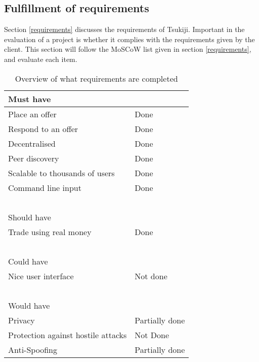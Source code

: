 \subsection{Fulfillment of requirements}
\label{requirementsfill}
Section \ref{requirements} discusses the requirements of Tsukiji.
Important in the evaluation of a project is whether it complies with the requirements given by the client.
This section will follow the MoSCoW list given in section \ref{requirements}, and evaluate each item.
\begin{table}[H]
\centering
    \begin{tabular}{|l|l|}
    \hline
    Must have                          & ~              \\ \hline
    Place an offer                     & Done           \\
    Respond to an offer                & Done           \\
    Decentralised                      & Done           \\
    Peer discovery                     & Done           \\
    Scalable to thousands of users     & Done           \\
    Command line input                 & Done           \\
    ~                                  & ~              \\ \hline
    Should have                        & ~              \\ \hline
    Trade using real money             & Done           \\
    ~                                  & ~              \\ \hline
    Could have                         & ~              \\ \hline
    Nice user interface                & Not done       \\
    ~                                  & ~              \\ \hline
    Would have                         & ~              \\ \hline
    Privacy                            & Partially done \\
    Protection against hostile attacks & Not Done       \\
    Anti-Spoofing                      & Partially done \\ \hline
    \end{tabular}
    \caption {Overview of what requirements are completed}
\end{table}

